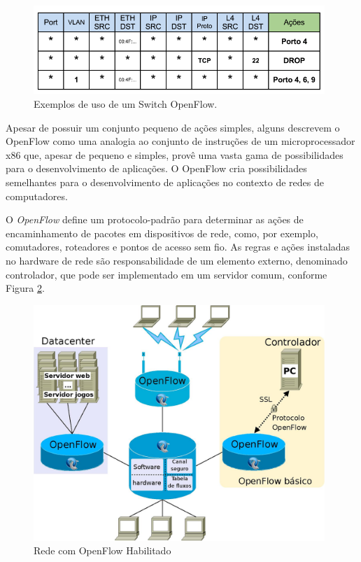 \begin{figure}[hb] \centering
\includegraphics[width=110mm]{exemploSwitchOpenFlow.png} 
\caption{Exemplos de uso de um Switch OpenFlow.} 
\label{fig:exemploSwitchOpenFlow} 
\end{figure}

Apesar de possuir um conjunto pequeno de ações simples, 
alguns descrevem o OpenFlow como uma analogia ao conjunto 
de instruções de um microprocessador x86 que, apesar de 
pequeno e simples, provê uma vasta gama de possibilidades 
para o desenvolvimento de aplicações. O OpenFlow cria 
possibilidades semelhantes para o desenvolvimento de 
aplicações no contexto de redes de computadores. 

O \textit{OpenFlow} define um protocolo-padrão
para determinar as ações de encaminhamento de pacotes em
dispositivos de rede, como, por exemplo, comutadores,
roteadores e pontos de acesso sem fio. As regras e ações
instaladas no hardware de rede são responsabilidade de um
elemento externo, denominado controlador, que pode ser
implementado em um servidor comum, conforme Figura
\ref{fig:openflow}.

\begin{figure}[hb] \centering
\includegraphics[width=110mm]{openflow.png} 
\caption{Rede com OpenFlow Habilitado} 
\label{fig:openflow} 
\end{figure}



